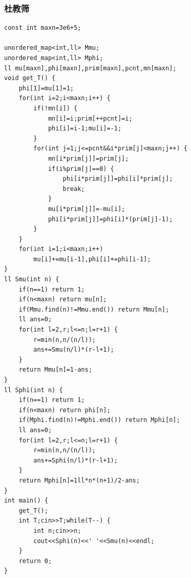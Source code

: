\documentclass[twoside]{article}
\begin{document}
\subsubsection{杜教筛}
\begin{lstlisting}
const int maxn=3e6+5;

unordered_map<int,ll> Mmu;
unordered_map<int,ll> Mphi;
ll mu[maxn],phi[maxn],prim[maxn],pcnt,mn[maxn];
void get_T() {
    phi[1]=mu[1]=1;
    for(int i=2;i<maxn;i++) {
        if(!mn[i]) {
            mn[i]=i;prim[++pcnt]=i;
            phi[i]=i-1;mu[i]=-1;
        }
        for(int j=1;j<=pcnt&&i*prim[j]<maxn;j++) {
            mn[i*prim[j]]=prim[j];
            if(i%prim[j]==0) {
                phi[i*prim[j]]=phi[i]*prim[j];
                break;
            }
            mu[i*prim[j]]=-mu[i];
            phi[i*prim[j]]=phi[i]*(prim[j]-1);
        }
    }
    for(int i=1;i<maxn;i++)
        mu[i]+=mu[i-1],phi[i]+=phi[i-1];
}
ll Smu(int n) {
    if(n==1) return 1;
    if(n<maxn) return mu[n];
    if(Mmu.find(n)!=Mmu.end()) return Mmu[n];
    ll ans=0;
    for(int l=2,r;l<=n;l=r+1) {
        r=min(n,n/(n/l));
        ans+=Smu(n/l)*(r-l+1);
    }
    return Mmu[n]=1-ans;
}
ll Sphi(int n) {
    if(n==1) return 1;
    if(n<maxn) return phi[n];
    if(Mphi.find(n)!=Mphi.end()) return Mphi[n];
    ll ans=0;
    for(int l=2,r;l<=n;l=r+1) {
        r=min(n,n/(n/l));
        ans+=Sphi(n/l)*(r-l+1);
    }
    return Mphi[n]=1ll*n*(n+1)/2-ans;
}
int main() {
    get_T();
    int T;cin>>T;while(T--) {
        int n;cin>>n;
        cout<<Sphi(n)<<' '<<Smu(n)<<endl;
    }
    return 0;
}\end{lstlisting}
\end{document}
